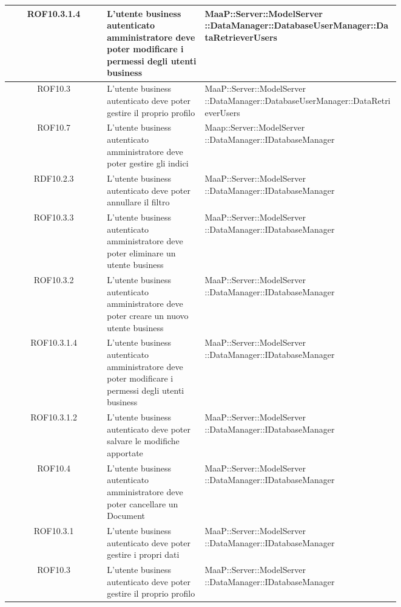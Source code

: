 \begin{center}
\begin{longtable}{|c|p{0.25\linewidth}|p{0.5\linewidth}|}
\midrule
ROF10.3.1.4
& L'utente business autenticato amministratore deve poter modificare i permessi degli utenti business
& MaaP::Server::ModelServer ::DataManager::DatabaseUserManager::DataRetrieverUsers\\

\midrule
ROF10.3
& L'utente business autenticato deve poter gestire il proprio profilo
& MaaP::Server::ModelServer ::DataManager::DatabaseUserManager::DataRetrieverUsers\\

\midrule
ROF10.7
& L'utente business autenticato amministratore deve poter gestire gli indici
& Maap::Server::ModelServer ::DataManager::IDatabaseManager\\

\midrule
RDF10.2.3
& L'utente business autenticato deve poter annullare il filtro
& MaaP::Server::ModelServer ::DataManager::IDatabaseManager\\

\midrule
ROF10.3.3
& L'utente business autenticato amministratore deve poter eliminare un utente business
& MaaP::Server::ModelServer ::DataManager::IDatabaseManager\\

\midrule
ROF10.3.2
& L'utente business autenticato amministratore deve poter creare un nuovo utente business
& MaaP::Server::ModelServer ::DataManager::IDatabaseManager\\

\midrule
ROF10.3.1.4
& L'utente business autenticato amministratore deve poter modificare i permessi degli utenti business
& MaaP::Server::ModelServer ::DataManager::IDatabaseManager\\

\midrule
ROF10.3.1.2
& L'utente business autenticato deve poter  salvare le modifiche apportate
& MaaP::Server::ModelServer ::DataManager::IDatabaseManager\\

\midrule
ROF10.4
& L'utente business autenticato amministratore deve poter cancellare un Document
& MaaP::Server::ModelServer ::DataManager::IDatabaseManager\\

\midrule
ROF10.3.1
& L'utente business autenticato deve poter gestire i propri dati
& MaaP::Server::ModelServer ::DataManager::IDatabaseManager\\

\midrule
ROF10.3
& L'utente business autenticato deve poter gestire il proprio profilo
& MaaP::Server::ModelServer ::DataManager::IDatabaseManager\\


\end{longtable}
\end{center}
